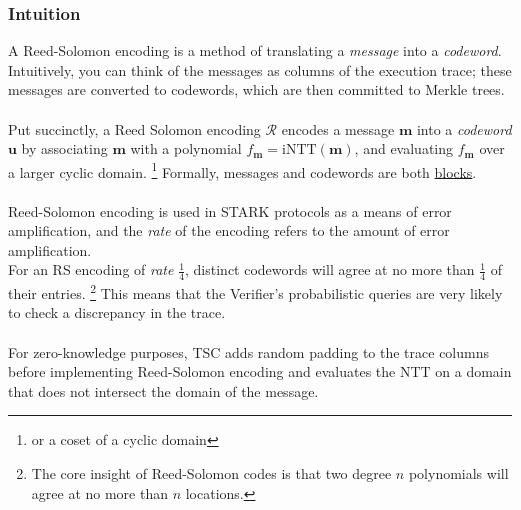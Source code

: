 \documentclass[10pt,letterpaper,titlepage]{article}
\theoremstyle{definition}
\begin{document}
\begin{appendices}
\subsubsection{Intuition}
A Reed-Solomon encoding is a method of translating a \textit{message} into a \textit{codeword}. 
Intuitively, you can think of the messages as columns of the execution trace; 
these messages are converted to codewords, which are then committed to Merkle trees.  \\
\\
Put succinctly, a Reed Solomon encoding $\mathcal{R}$ encodes a message $\mathbf{m}$ into a \textit{codeword} $\mathbf{u}$ by associating $\mathbf{m}$ with a polynomial $f_{\mathbf{m}} = \text{iNTT}(\mathbf{m})$, and evaluating $f_{\mathbf{m}}$ over a larger cyclic domain.%
\footnote{or a coset of a cyclic domain}
Formally, messages and codewords are both \hyperref[blocks]{blocks}. \\
\\
Reed-Solomon encoding is used in STARK protocols as a means of error amplification, and the \textit{rate} of the encoding refers to the amount of error amplification. \\
For an RS encoding of \textit{rate} $\frac{1}{4}$, distinct codewords will agree at no more than $\frac{1}{4}$ of their entries.%
\footnote{The core insight of Reed-Solomon codes is that two degree $n$ polynomials will agree at no more than $n$ locations.}
This means that the Verifier's probabilistic queries are very likely to check a discrepancy in the trace.
\\
\\
For zero-knowledge purposes, TSC adds random padding to the trace columns before implementing Reed-Solomon encoding and evaluates the NTT on a domain that does not intersect the domain of the message. 


\end{appendices}
\end{document}
